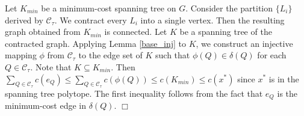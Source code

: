 \documentclass[11pt]{article}
\newcommand{\qed}{\hspace*{\fill}$\Box$}
\newenvironment{proof}[1][Proof. ]{\noindent {\bf #1 }}{\qed}
\begin{document}
\begin{proof}
Let $K_{min}$ be a minimum-cost spanning tree on $G$.
Consider the partition $\{L_i\}$ derived by $\mathcal{C}_\tau$.
We contract every $L_i$ into a single vertex.
Then the resulting graph obtained from $K_{min}$ is connected.
Let $K$ be a spanning tree of the contracted graph.
Applying Lemma \ref{base_inj} to $K$,
we construct an injective mapping $\phi$ from $\mathcal{C}_\tau$
to the edge set of $K$ such that $\phi(Q)\in \delta(Q)$
for each $Q\in \mathcal{C}_\tau$.
Note that $K\subseteq K_{min}$.
Then $\sum_{Q\in \mathcal{C}_\tau} c(e_Q) \leq
\sum_{Q\in \mathcal{C}_\tau} c(\phi(Q)) \leq c(K_{min})\leq c(x^*)$
since $x^*$ is in the spanning tree polytope. The first inequality follows from the fact that
$e_Q$ is the minimum-cost edge in $\delta(Q)$.
\end{proof}
\end{document}
